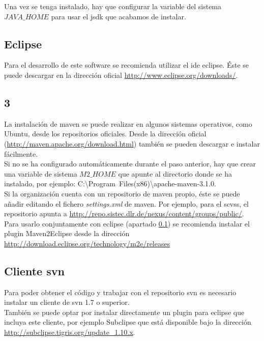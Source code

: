 Una vez se tenga instalado, hay que configurar la variable del sistema $JAVA\_HOME$ para usar el \gls{jsdk} que acabamos de instalar.

\subsection{Eclipse}
\label{subsubsection:eclipsesolr}
Para el desarrollo de este software se recomienda utilizar el \gls{ide} \gls{eclipse}. Éste se puede descargar en la dirección oficial \url{http://www.eclipse.org/downloads/}.

\subsection{\maven{} 3}
La instalación de \gls{maven} se puede realizar en algunos sistemas operativos, como Ubuntu, desde los repositorios oficiales. Desde la dirección oficial (\url{http://maven.apache.org/download.html}) también se pueden descargar e instalar fácilmente.\\

Si no se ha configurado automáticamente durante el paso anterior, hay que crear una variable de sistema $M2\_HOME$ que apunte al directorio donde se ha instalado, por ejemplo:
\mbox{C:\textbackslash{}Program Files(x86)\textbackslash{}apache-maven-3.1.0}.\\

Si la organización cuenta con un repositorio de \gls{maven} propio, éste se puede añadir editando el fichero \textit{settings.xml} de \gls{maven}. Por ejemplo, para el \gls{scvss}, el repositorio apunta a \url{http://repo.sistec.dlr.de/nexus/content/groups/public/}.\\

Para usarlo conjuntamente con \gls{eclipse} (apartado \ref{subsubsection:eclipsesolr}) se recomienda instalar el \gls{plugin} Maven2Eclipse desde la dirección \url{http://download.eclipse.org/technology/m2e/releases}

\subsection{Cliente \Gls{svn}}
Para poder obtener el código y trabajar con el repositorio \gls{svn} es necesario instalar un cliente de \gls{svn} 1.7 o superior.\\

También se puede optar por instalar directamente un \gls{plugin} para \gls{eclipse} que incluya este cliente, por ejemplo Subclipse que está disponible bajo la dirección \url{http://subclipse.tigris.org/update_1.10.x}.

